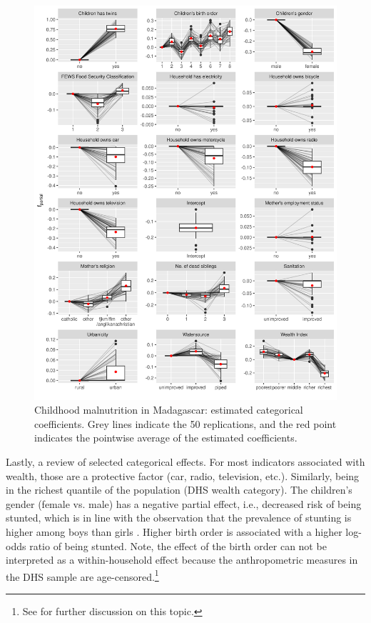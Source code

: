 \begin{figure}[!p]
	\centering
	\includegraphics[width=\textwidth, keepaspectratio]{figures/madagascar_categoricaleffects.png}
	\caption{Childhood malnutrition in Madagascar: estimated categorical coefficients. Grey lines indicate the 50 replications, and the red point indicates the pointwise average of the estimated coefficients.}
	\label{fig:madagascar_categoricaleffects}
\end{figure}

Lastly, a review of selected categorical effects. For most indicators associated with wealth, those are a protective factor (car, radio, television, etc.). Similarly, being in the richest quantile of the population (DHS wealth category). The children's gender (female vs. male) has a negative partial effect, i.e., decreased risk of being stunted, which is in line with the observation that the prevalence of stunting is higher among boys than girls \autocite[][p. 10]{unicefImprovingChildNutrition2013}. Higher birth order is associated with a higher log-odds ratio of being stunted. Note, the effect of the birth order can not be interpreted as a within-household effect because the anthropometric measures in the DHS sample are age-censored.\footnote{See \cite{spearsEndogenousInclusionDemographic2022} for further discussion on this topic.}

